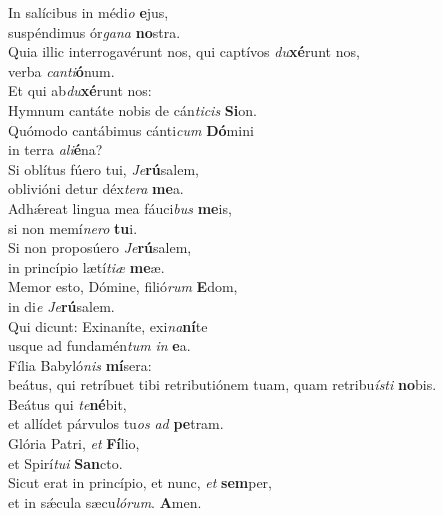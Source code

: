 \evenverse In salícibus in médi\textit{o} \textbf{e}jus,~\*\\
\evenverse suspéndimus ór\textit{ga}\textit{na} \textbf{no}stra.\\
\oddverse Quia illic interrogavérunt nos, qui captívos \textit{du}\textbf{xé}runt nos,~\*\\
\oddverse verba \textit{can}\textit{ti}\textbf{ó}num.\\
\evenverse Et qui ab\textit{du}\textbf{xé}runt nos:~\*\\
\evenverse Hymnum cantáte nobis de cán\textit{ti}\textit{cis} \textbf{Si}on.\\
\oddverse Quómodo cantábimus cánti\textit{cum} \textbf{Dó}mini~\*\\
\oddverse in terra \textit{a}\textit{li}\textbf{é}na?\\
\evenverse Si oblítus fúero tui, \textit{Je}\textbf{rú}salem,~\*\\
\evenverse oblivióni detur déx\textit{te}\textit{ra} \textbf{me}a.\\
\oddverse Adhǽreat lingua mea fáuci\textit{bus} \textbf{me}is,~\*\\
\oddverse si non memí\textit{ne}\textit{ro} \textbf{tu}i.\\
\evenverse Si non proposúero \textit{Je}\textbf{rú}salem,~\*\\
\evenverse in princípio lætí\textit{ti}\textit{æ} \textbf{me}æ.\\
\oddverse Memor esto, Dómine, filió\textit{rum} \textbf{E}dom,~\*\\
\oddverse in di\textit{e} \textit{Je}\textbf{rú}salem.\\
\evenverse Qui dicunt: Exinaníte, exi\textit{na}\textbf{ní}te~\*\\
\evenverse usque ad fundamén\textit{tum} \textit{in} \textbf{e}a.\\
\oddverse Fília Babyló\textit{nis} \textbf{mí}sera:~\*\\
\oddverse beátus, qui retríbuet tibi retributiónem tuam, quam retribu\textit{í}\textit{sti} \textbf{no}bis.\\
\evenverse Beátus qui \textit{te}\textbf{né}bit,~\*\\
\evenverse et allídet párvulos tu\textit{os} \textit{ad} \textbf{pe}tram.\\
\oddverse Glória Patri, \textit{et} \textbf{Fí}lio,~\*\\
\oddverse et Spirí\textit{tu}\textit{i} \textbf{San}cto.\\
\evenverse Sicut erat in princípio, et nunc, \textit{et} \textbf{sem}per,~\*\\
\evenverse et in sǽcula sæcu\textit{ló}\textit{rum}. \textbf{A}men.\\
